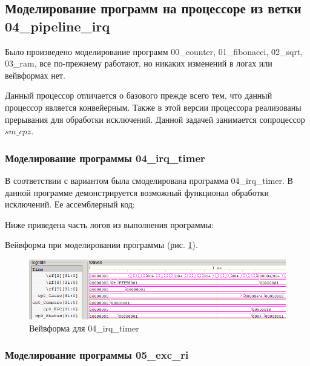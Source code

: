 \documentclass[a4paper,14pt]{article}
\begin{document}
	

	\subsection{Моделирование программ на процессоре из ветки 04\_pipeline\_irq}
	
	Было произведено моделирование программ  00\_counter, 01\_fibonacci, 02\_sqrt, 03\_ram, все по-прежнему работают, но никаких изменений в логах или вейвформах нет.
	
	Данный процессор отличается о базового прежде всего тем, что данный процессор является конвейерным.
	Также в этой версии процессора реализованы прерывания для обработки исключений.
	Данной задачей занимается сопроцессор $sm\_cpz$.
	\subsubsection{Моделирование программы 04\_irq\_timer}
	
	В соответствии с вариантом была смоделирована программа 04\_irq\_timer.
	В данной программе демонстрируется возможный функционал обработки исключений.
	Ее ассемблерный код:
	
	{\small {}}
	
	Ниже приведена часть логов из выполнения программы:
	
	{\small {}}
	
	Вейвформа при моделировании программы (рис. \ref{fig:0404wvf}).
	
	\begin{figure}[H]
		\centering
		\includegraphics[width=0.95\linewidth]{images/04_04_wvf}
		\caption{Вейвформа для  04\_irq\_timer}
		\label{fig:0404wvf}
	\end{figure}

	\subsubsection{Моделирование программы 05\_exc\_ri}
	
\end{document}
